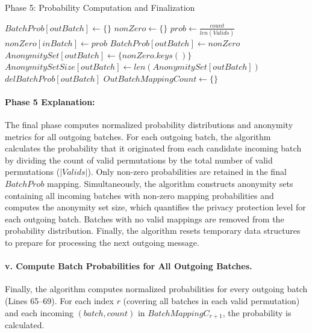 \documentclass{article}
\begin{document}
\begin{algorithm}[H]
\caption{Phase 5: Probability Computation and Finalization}
\begin{algorithmic}[1]
        \State $ BatchProb[outBatch] \gets \{ \} $
    \EndIf
    \State $ nonZero \gets \{ \} $
        \State $ prob \gets \frac{count}{len(Valids)}$
            \State $ nonZero[inBatch] \gets prob $
        \EndIf
    \EndFor
        \State $ BatchProb[outBatch] \gets nonZero $
        \State $ AnonymitySet[outBatch] \gets \{ nonZero.keys() \} $
        \State $ AnonymitySetSize[outBatch] \gets len(AnonymitySet[outBatch]) $
    \Else
            \State $ del BatchProb[outBatch] $
        \EndIf
    \EndIf
\EndFor
\State $OutBatchMappingCount \gets \{ \} $
\end{algorithmic}
\end{algorithm}

\paragraph{Phase 5 Explanation:}
The final phase computes normalized probability distributions and anonymity metrics for all outgoing batches. For each outgoing batch, the algorithm calculates the probability that it originated from each candidate incoming batch by dividing the count of valid permutations by the total number of valid permutations ($|Valids|$). Only non-zero probabilities are retained in the final $BatchProb$ mapping. Simultaneously, the algorithm constructs anonymity sets containing all incoming batches with non-zero mapping probabilities and computes the anonymity set size, which quantifies the privacy protection level for each outgoing batch. Batches with no valid mappings are removed from the probability distribution. Finally, the algorithm resets temporary data structures to prepare for processing the next outgoing message.

\paragraph{v. Compute Batch Probabilities for All Outgoing Batches.}
Finally, the algorithm computes normalized probabilities for every outgoing batch (Lines 65–69). 
For each index $r$ (covering all batches in each valid permutation) and each incoming $(batch, count)$ in $BatchMappingC_{r+1}$, the probability is calculated.
\end{document}

